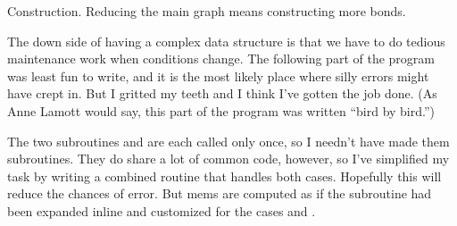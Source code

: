 Construction. Reducing the main graph means
constructing more bonds.

The down side of having a complex data structure is that
we have to do tedious maintenance work when conditions change. The following
part of the program was least fun to write, and it is the most likely
place where silly errors might have crept in. But I gritted my teeth
and I think I've gotten the job done. (As Anne Lamott would say,
this part of the program was written ``bird by bird.'')

The two subroutines  and  are each
called
only once, so I needn't have made them subroutines. They do share a
lot of common code, however, so I've simplified my task by writing
a combined routine that handles both cases. Hopefully this will reduce
the chances of error. But mems are computed as if the subroutine had
been expanded inline and customized for the cases  and .

